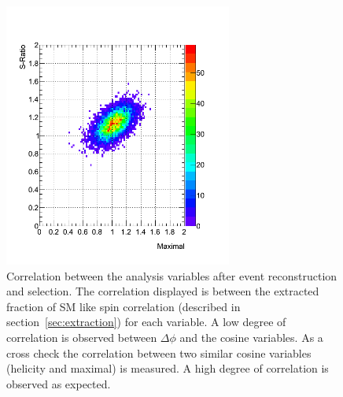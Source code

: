 \begin{figure}[htpb!]
\begin{center}
\includegraphics[width=75mm]{f/correlation_op_sratio}
\end{center}
\caption{Correlation between the analysis variables after event reconstruction and selection. The correlation displayed is between the extracted fraction of SM like spin correlation (described in section~\ref{sec:extraction}) for each variable. A low degree of correlation is observed between $\Delta\phi$ and the cosine variables. As a cross check the correlation between two similar cosine variables (helicity and maximal) is measured. A high degree of correlation is observed as expected.}
\label{fig:correlation}
\end{figure} 

